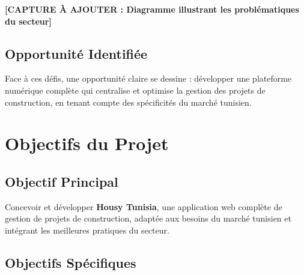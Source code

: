 \textbf{[CAPTURE À AJOUTER : Diagramme illustrant les problématiques du secteur]}

\subsection{Opportunité Identifiée}

Face à ces défis, une opportunité claire se dessine : développer une plateforme numérique complète qui centralise et optimise la gestion des projets de construction, en tenant compte des spécificités du marché tunisien.

\section{Objectifs du Projet}

\subsection{Objectif Principal}

Concevoir et développer \textbf{Housy Tunisia}, une application web complète de gestion de projets de construction, adaptée aux besoins du marché tunisien et intégrant les meilleures pratiques du secteur.

\subsection{Objectifs Spécifiques}

